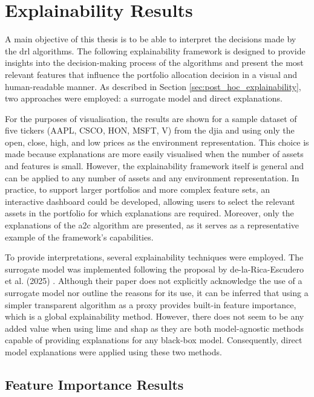 \section{Explainability Results} \label{sec:explainability-framework}

A main objective of this thesis is to be able to interpret the decisions made by the \acrshort{drl} algorithms. The following explainability framework is designed to provide insights into the decision-making process of the algorithms and present the most relevant features that influence the portfolio allocation decision in a visual and human-readable manner. As described in Section \ref{sec:post_hoc_explainability}, two approaches were employed: a surrogate model and direct explanations. 

For the purposes of visualisation, the results are shown for a sample dataset of five tickers (AAPL, CSCO, HON, MSFT, V) from the \acrshort{djia} and using only the open, close, high, and low prices as the environment representation. This choice is made because explanations are more easily visualised when the number of assets and features is small. However, the explainability framework itself is general and can be applied to any number of assets and any environment representation. In practice, to support larger portfolios and more complex feature sets, an interactive dashboard could be developed, allowing users to select the relevant assets in the portfolio for which explanations are required. Moreover, only the explanations of the \acrshort{a2c} algorithm are presented, as it serves as a representative example of the framework's capabilities.

To provide interpretations, several explainability techniques were employed. The surrogate model was implemented following the proposal by de-la-Rica-Escudero et al. (2025) \cite{de-La-Rica-Escudero2025}. Although their paper does not explicitly acknowledge the use of a surrogate model nor outline the reasons for its use, it can be inferred that using a simpler transparent algorithm as a proxy provides built-in feature importance, which is a global explainability method. However, there does not seem to be any added value when using \acrshort{lime} and \acrshort{shap} as they are both model-agnostic methods capable of providing explanations for any black-box model. Consequently, direct model explanations were applied using these two methods.

\subsection{Feature Importance Results} \label{sec:feature-importance-results}

